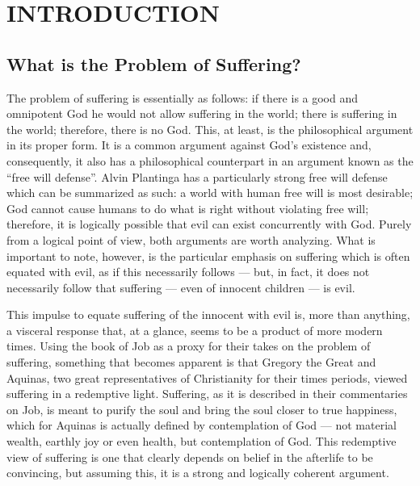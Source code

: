 \chapter{INTRODUCTION}

\pagestyle{myheadings}

\label{introduction}

\section{What is the Problem of Suffering?}
The problem of suffering is essentially as follows: if there is a good and omnipotent God he would not allow suffering in the world; there is suffering in the world; therefore, there is no God. This, at least, is the philosophical argument in its proper form. It is a common argument against God's existence and, consequently, it also has a philosophical counterpart in an argument known as the ``free will defense''. Alvin Plantinga has a particularly strong free will defense which can be summarized as such: a world with human free will is most desirable; God cannot cause humans to do what is right without violating free will; therefore, it is logically possible that evil can exist concurrently with God. Purely from a logical point of view, both arguments are worth analyzing. What is important to note, however, is the particular emphasis on suffering which is often equated with evil, as if this necessarily follows --- but, in fact, it does not necessarily follow that suffering --- even of innocent children --- is evil.

This impulse to equate suffering of the innocent with evil is, more than anything, a visceral response that, at a glance, seems to be a product of more modern times. Using the book of Job as a proxy for their takes on the problem of suffering, something that becomes apparent is that Gregory the Great and Aquinas, two great representatives of Christianity for their times periods, viewed suffering in a redemptive light. Suffering, as it is described in their commentaries on Job, is meant to purify the soul and bring the soul closer to true happiness, which for Aquinas is actually defined by contemplation of God --- not material wealth, earthly joy or even health, but contemplation of God. This redemptive view of suffering is one that clearly depends on belief in the afterlife to be convincing, but assuming this, it is a strong and logically coherent argument.


